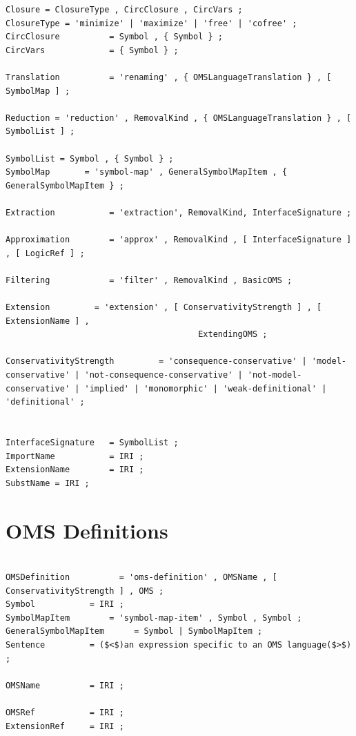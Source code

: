 \documentclass[10pt,fleqn,final]{scrreprt}
\newcommand*{\syntax}[1]{\texttt{#1}}
\newcommand{\sclause}[1]{\section{#1}}
\newenvironment{definitions}[0]{\medskip }{}
\begin{document}
\begin{definitions}
\begin{lstlisting}[language=ebnf,escapeinside={()}]
Closure = ClosureType , CircClosure , CircVars ;
ClosureType = 'minimize' | 'maximize' | 'free' | 'cofree' ;
CircClosure          = Symbol , { Symbol } ;
CircVars             = { Symbol } ;

Translation          = 'renaming' , { OMSLanguageTranslation } , [ SymbolMap ] ;

Reduction = 'reduction' , RemovalKind , { OMSLanguageTranslation } , [ SymbolList ] ;

SymbolList = Symbol , { Symbol } ;
SymbolMap       = 'symbol-map' , GeneralSymbolMapItem , { GeneralSymbolMapItem } ;

Extraction           = 'extraction', RemovalKind, InterfaceSignature ;

Approximation        = 'approx' , RemovalKind , [ InterfaceSignature ] , [ LogicRef ] ;

Filtering            = 'filter' , RemovalKind , BasicOMS ;

Extension         = 'extension' , [ ConservativityStrength ] , [ ExtensionName ] , 
                                       ExtendingOMS ;

ConservativityStrength         = 'consequence-conservative' | 'model-conservative' | 'not-consequence-conservative' | 'not-model-conservative' | 'implied' | 'monomorphic' | 'weak-definitional' | 'definitional' ;


InterfaceSignature   = SymbolList ;
ImportName           = IRI ;
ExtensionName        = IRI ;
SubstName = IRI ;
\end{lstlisting}


\sclause{OMS Definitions}

\begin{lstlisting}[language=ebnf,escapeinside={()}]  % abstract syntax

OMSDefinition          = 'oms-definition' , OMSName , [ ConservativityStrength ] , OMS ;
Symbol           = IRI ;
SymbolMapItem        = 'symbol-map-item' , Symbol , Symbol ;
GeneralSymbolMapItem      = Symbol | SymbolMapItem ;
Sentence         = ($<$)an expression specific to an OMS language($>$) ;
                 
OMSName          = IRI ;
                 
OMSRef           = IRI ;
ExtensionRef     = IRI ;
                 

\end{lstlisting}
\end{definitions}
\end{document}
